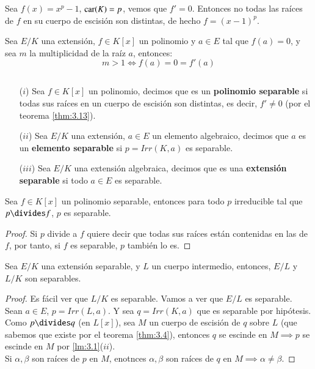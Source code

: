 \begin{eg}
    Sea $f(x) = x^p -1$, $\mathrm{car}(K) = p$, vemos que $f' = 0$. Entonces no todas las raíces de $f$ en su cuerpo de escisión son distintas, de hecho $f = (x-1)^p$.
\end{eg}

\begin{pro}\label{pro:3.4.2}
    Sea $E/K$ una extensión, $f \in K[x]$  un polinomio y $a \in E$ tal que $f(a) = 0$, y sea $m$ la multiplicidad de la raíz $a$, entonces:
    $$
        m > 1 \iff f(a)=0=f'(a)
    $$
\end{pro}

\begin{dfn}$ $
    \begin{itemize}
        \item[($i$)] Sea $f \in K[x]$ un polinomio, decimos que es un \textbf{polinomio separable} si todas sus raíces en un cuerpo de escisión son distintas, es decir, $f' \neq 0$ (por el teorema \ref{thm:3.13}).
        \item[($ii$)] Sea $E/K$ una extensión, $a \in E$ un elemento algebraico, decimos que $a$ es un \textbf{elemento separable} si $p = Irr(K, a)$ es separable.
        \item[($iii$)] Sea $E/K$ una extensión algebraica, decimos que es una \textbf{extensión separable} si todo $a \in E$ es separable.
    \end{itemize}
\end{dfn}

\begin{pro}\label{pro:sepdiv}
    Sea $f \in K[x]$ un polinomio separable, entonces para todo $p$ irreducible tal que $p \divides f$, $p$ es separable.
\end{pro}
\begin{proof}
    Si $p$ divide a $f$ quiere decir que todas sus raíces están contenidas en las de $f$, por tanto, si $f$ es separable, $p$ también lo es.
\end{proof}

\begin{pro}
    Sea $E/K$ una extensión separable, y $L$ un cuerpo intermedio, entonces, $E/L$ y $L/K$ son separables.
\end{pro}
\begin{proof}
    Es fácil ver que $L/K$ es separable. Vamos a ver que $E/L$ es separable.\\
    Sean $a \in E$, $p = Irr(L, a)$. Y sea $q = Irr(K, a)$ que es separable por hipótesis. Como $p \divides q$ (en $L[x]$), sea $M$ un cuerpo de escisión de $q$ sobre $L$ (que sabemos que existe por el teorema \ref{thm:3.4}), entonces $q$ se escinde en $M \implies p$ se escinde en $M$ por \ref{lm:3.1}($ii$).\\

    Si $\alpha, \beta$ son raíces de $p$ en $M$, enotnces $\alpha, \beta$ son raíces de $q$ en $M \implies \alpha \neq \beta$.
\end{proof}

